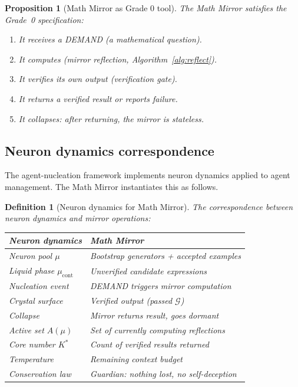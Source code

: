 \documentclass[11pt,a4paper]{article}
\newtheorem{proposition}[theorem]{Proposition}
\newtheorem{definition}[theorem]{Definition}
\newcommand{\cG}{\mathcal{G}}
\begin{document}
\begin{proposition}[Math Mirror as Grade 0 tool]\label{prop:grade0}
The Math Mirror satisfies the Grade~0 specification:
\begin{enumerate}[label=(\alph*),nosep]
\item It receives a DEMAND (a mathematical question).
\item It computes (mirror reflection, Algorithm~\ref{alg:reflect}).
\item It verifies its own output (verification gate).
\item It returns a verified result or reports failure.
\item It collapses: after returning, the mirror is stateless.
\end{enumerate}
\end{proposition}

\subsection{Neuron dynamics correspondence}

The agent-nucleation framework implements neuron dynamics
applied to agent management.
The Math Mirror instantiates this as follows.

\begin{definition}[Neuron dynamics for Math Mirror]\label{def:neuron}
The correspondence between neuron dynamics and mirror operations:
\begin{center}
\small
\renewcommand{\arraystretch}{1.15}
\begin{tabular}{@{}ll@{}}
\toprule
\textbf{Neuron dynamics} & \textbf{Math Mirror} \\
\midrule
Neuron pool $\mu$ & Bootstrap generators + accepted examples \\
Liquid phase $\mu_{\text{cont}}$ & Unverified candidate expressions \\
Nucleation event & DEMAND triggers mirror computation \\
Crystal surface & Verified output (passed $\cG$) \\
Collapse & Mirror returns result, goes dormant \\
Active set $A(\mu)$ & Set of currently computing reflections \\
Core number $K^*$ & Count of verified results returned \\
Temperature & Remaining context budget \\
Conservation law & Guardian: nothing lost, no self-deception \\
\bottomrule
\end{tabular}
\end{center}
\end{definition}
\end{document}
